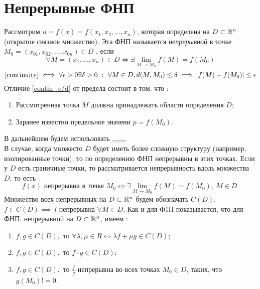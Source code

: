 \documentclass[../../main.tex]{subfiles}
\begin{document}
	
	\section{Непрерывные ФНП}	
	
	Рассмотрим $u = f(x) = f(x_1, x_2, \ldots, x_n)$, которая определена на 
	$D \subset \mathbb{R}^n$ (открытое связное множество). Эта ФНП называется
	\emph{непрерывной} в точке $M_0 = (x_{01}, x_{02}, \ldots, x_{0n}) \in D$
	, если
	\begin{equation}
	\label{continuity}
	\forall M = (x_1, \ldots, x_n) \in D \iff \exists 
	\lim\limits_{M \to M_0}f(M) = f(M_0)
	\end{equation}
	\begin{equation}
	\label{contin_e/d}
	\eqref{continuity} \iff \forall \epsilon > 0 \exists \delta > 0 \ : \ 
	\forall M \in D
	, d(M, M_0) \leq \delta \implies |f(M) - f(M_0)| \leq \epsilon
	\end{equation}
	Отличие \eqref{contin_e/d} от предела состоит в том, что :
	\begin{enumerate}
		\item  Рассмотренная точка $M$ должна принадлежать области 
		       определения $D$;
		\item Заранее известно предельное значени $p = f(M_0)$.
	\end{enumerate}
    В дальнейшем будем использовать ,,,,,,,\\
    В случае, когда множесто $D$ будет иметь более сложную структуру 
    (например, изолированные точки), то по определению ФНП непрерывны в этих
    точках. Если у $D$ есть граничные точки, то рассматривается непрерывность 
    вдоль множества $D$, то есть :
    \[
       f(x) \text{ непрерывна в точке } M_0 \iff \exists \lim\limits_{M \to M_0}
       f(M) = f(M_0), \ M \in D.
    \]
    Множество всех непрерывных на $D \subset \mathbb{R}^n$ будем обозначать $C(D)$.
    $f \in C(D) \implies f$ непрерывна $\forall M \in D$. Как и для Ф1П 
    показывается, что для ФНП, непрерывной на $D \subset \mathbb{R}^n$, имеем :
    \begin{enumerate}
    	\item $f, g \in C(D),$ то $\forall \lambda, \mu \in R \iff 
    	      \lambda f + \mu g \in C(D)$;
    	\item $f, g \in C(D),$ то $f \cdot g \in C(D)$;
    	\item $f, g \in C(D),$ то $\frac{f}{g}$ непрерывна  во всех точках 
    	      $M_0 \in D$, таких, что  $g(M_0) != 0$.
    \end{enumerate}
\end{document}
